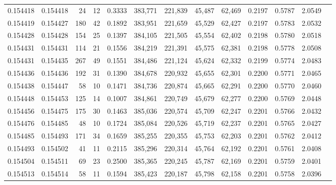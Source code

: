 \begin{tabular}{rrrrrrrrrrrrr}
0.154418 & 0.154418 &    24 &  12 &                                     0.3333 & 383,771 & 221,839 &  45,487 &  62,469 & 0.2197 & 0.5787 & 2.0549 \\
0.154419 & 0.154427 &   180 &  42 &                                     0.1892 & 383,951 & 221,659 &  45,529 &  62,427 & 0.2197 & 0.5783 & 2.0532 \\
0.154428 & 0.154428 &   154 &  25 &                                     0.1397 & 384,105 & 221,505 &  45,554 &  62,402 & 0.2198 & 0.5780 & 2.0518 \\
0.154431 & 0.154431 &   114 &  21 &                                     0.1556 & 384,219 & 221,391 &  45,575 &  62,381 & 0.2198 & 0.5778 & 2.0508 \\
0.154431 & 0.154435 &   267 &  49 &                                     0.1551 & 384,486 & 221,124 &  45,624 &  62,332 & 0.2199 & 0.5774 & 2.0483 \\
0.154436 & 0.154436 &   192 &  31 &                                     0.1390 & 384,678 & 220,932 &  45,655 &  62,301 & 0.2200 & 0.5771 & 2.0465 \\
0.154438 & 0.154447 &    58 &  10 &                                     0.1471 & 384,736 & 220,874 &  45,665 &  62,291 & 0.2200 & 0.5770 & 2.0460 \\
0.154448 & 0.154453 &   125 &  14 &                                     0.1007 & 384,861 & 220,749 &  45,679 &  62,277 & 0.2200 & 0.5769 & 2.0448 \\
0.154456 & 0.154475 &   175 &  30 &                                     0.1463 & 385,036 & 220,574 &  45,709 &  62,247 & 0.2201 & 0.5766 & 2.0432 \\
0.154476 & 0.154485 &    48 &  10 &                                     0.1724 & 385,084 & 220,526 &  45,719 &  62,237 & 0.2201 & 0.5765 & 2.0427 \\
0.154485 & 0.154493 &   171 &  34 &                                     0.1659 & 385,255 & 220,355 &  45,753 &  62,203 & 0.2201 & 0.5762 & 2.0412 \\
0.154493 & 0.154502 &    41 &  11 &                                     0.2115 & 385,296 & 220,314 &  45,764 &  62,192 & 0.2201 & 0.5761 & 2.0408 \\
0.154504 & 0.154511 &    69 &  23 &                                     0.2500 & 385,365 & 220,245 &  45,787 &  62,169 & 0.2201 & 0.5759 & 2.0401 \\
0.154513 & 0.154514 &    58 &  11 &                                     0.1594 & 385,423 & 220,187 &  45,798 &  62,158 & 0.2201 & 0.5758 & 2.0396 \\

\end{tabular}
